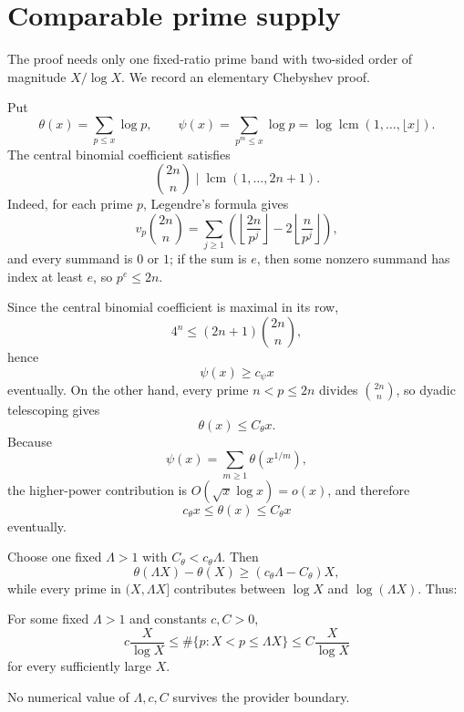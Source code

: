 \section{Comparable prime supply}
\label{app:prime-supply}

The proof needs only one fixed-ratio prime band with two-sided order of
magnitude $X/\log X$.  We record an elementary Chebyshev proof.

Put
\[
\theta(x)=\sum_{p\le x}\log p,
\qquad
\psi(x)=\sum_{p^m\le x}\log p
=\log\operatorname{lcm}(1,\ldots,\lfloor x\rfloor).
\]
The central binomial coefficient satisfies
\[
\binom{2n}{n}\mid\operatorname{lcm}(1,\ldots,2n+1).
\]
Indeed, for each prime $p$, Legendre's formula gives
\[
v_p\binom{2n}{n}
=\sum_{j\ge1}
\left(\left\lfloor\frac{2n}{p^j}\right\rfloor
-2\left\lfloor\frac n{p^j}\right\rfloor\right),
\]
and every summand is $0$ or $1$; if the sum is $e$, then some nonzero summand
has index at least $e$, so $p^e\le2n$.

Since the central binomial coefficient is maximal in its row,
\[
4^n\le(2n+1)\binom{2n}{n},
\]
hence
\[
\psi(x)\ge c_\psi x
\]
eventually.  On the other hand, every prime $n<p\le2n$ divides
$\binom{2n}{n}$, so dyadic telescoping gives
\[
\theta(x)\le C_\theta x.
\]
Because
\[
\psi(x)=\sum_{m\ge1}\theta(x^{1/m}),
\]
the higher-power contribution is $O(\sqrt x\log x)=o(x)$, and therefore
\[
c_\theta x\le\theta(x)\le C_\theta x
\tag{P1}\label{eq:chebyshev-linear}
\]
eventually.

Choose one fixed $\Lambda>1$ with
$C_\theta<c_\theta\Lambda$.  Then
\[
\theta(\Lambda X)-\theta(X)
\ge(c_\theta\Lambda-C_\theta)X,
\]
while every prime in $(X,\Lambda X]$ contributes between
$\log X$ and $\log(\Lambda X)$.  Thus:

\begin{proposition}\label{prop:prime-band}
For some fixed $\Lambda>1$ and constants $c,C>0$,
\[
c\frac X{\log X}
\le
\#\{p:X<p\le\Lambda X\}
\le
C\frac X{\log X}
\]
for every sufficiently large $X$.
\end{proposition}

No numerical value of $\Lambda,c,C$ survives the provider boundary.


